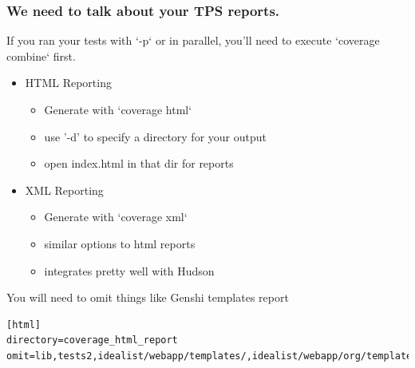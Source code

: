 \documentclass{beamer}
\begin{document}
\begin{frame}[fragile]
  \frametitle{We need to talk about your TPS reports.}
  If you ran your tests with `-p` or in parallel, you'll need to
  execute `coverage combine` first.
  \begin{itemize}
    \item HTML Reporting
      \begin{itemize} 
        \item Generate with `coverage html`
        \item use '-d' to specify a directory for your output
        \item open index.html in that dir for reports
      \end{itemize}
   \item XML Reporting
     \begin{itemize}
       \item Generate with `coverage xml`
       \item similar options to html reports
       \item integrates pretty well with Hudson
     \end{itemize}
  \end{itemize}
  You will need to omit things like Genshi templates report
\lstset{language=Python,basicstyle=\tiny}
\begin{lstlisting}
[html]
directory=coverage_html_report
omit=lib,tests2,idealist/webapp/templates/,idealist/webapp/org/templates/
\end{lstlisting}
\end{frame}  
\end{document}
